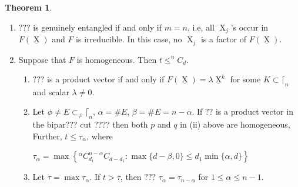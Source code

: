 \documentclass[a4paper,12pt]{article}
\DeclareMathOperator{\x}{\mathrm{X}}
\theoremstyle{definition}
\theoremstyle{underlinethm}
\newtheorem{thm}{Theorem}[section]
\theoremstyle{underline}
\begin{document}
\begin{thm}
\begin{enumerate}[label=(\roman*)]
  \item $???$ is genuinely entangled if and only if $m=n$, i.e, all $\x_{j}$'s occur in $F(\underline{\x})$ and $F$ is irreducible. In this case, no $\x_{j}$ is a factor of $F(\underline{\x})$.
  
  \item Suppose that $F$ is homogeneous. Then $t \leq ^{n}C_{d}$.
  
  \begin{enumerate}[label=(\alph*)] 
   \item $???$ is a product vector if and only if $F(\underline{\x}) = \lambda\underline{\x}^{k}$ for some $K\subset \lceil_{n}$ and scalar $\lambda \neq 0$.
   \item Let $\phi \neq E \subset_{\neq}\lceil_{n}$, $\alpha = \# E$, $\beta = \#E = n-\alpha$.   If $??$ is a product vector in the bipar??? cut ???? then both $p$ and $q$ in (ii) above are homogeneous, Further, $t \leq \tau_{\alpha}$, where 
   
   $\tau_{\alpha} = \max \left\{ ^{\alpha}C_{d_{1}} ^{n-\alpha}C_{d-d_{1}} : \max \{d-\beta, 0\} \leq d_{1} \min \{\alpha, d\}\right\}$ 
   
   \item Let $\tau = \max \tau_{\alpha}$. If $t > \tau$, then $???$ $\tau_{\alpha} = \tau_{n-\alpha}$ for $1 \leq \alpha \leq n-1$.
  \end{enumerate}
 \end{enumerate}
 \end{thm}
\end{document}
